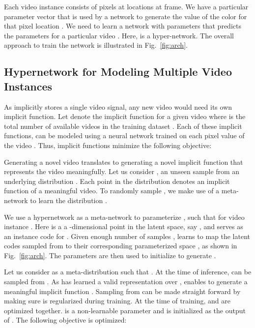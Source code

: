 \documentclass[10pt]{article} \usepackage[accepted]{tmlr}
\begin{document}
\label{method}
Each video instance  consists of pixels at locations  at  frame. We have a particular parameter vector  that is used by a network  to generate the value of the color  for that pixel location . We need to learn a network  with parameters  that predicts the parameters  for a particular video . Here,  is a hyper-network. The overall approach to train the network is illustrated in Fig.~\ref{fig:arch}.

\subsection{Hypernetwork for Modeling Multiple Video Instances}

As   implicitly stores a single video signal, any new video would need its own implicit function. 
Let  denote the implicit function for a given video  where  is the total number of available videos in the training dataset . Each of these implicit functions,  can be modeled using a neural network trained on each pixel value of the video . Thus, implicit functions minimize the following objective: 

Generating a novel video  translates to generating a novel implicit function  that represents the video meaningfully. Let us consider , an unseen sample from an underlying distribution . Each point in the distribution  denotes an implicit function of a meaningful video. To randomly sample , we make use of a meta-network to learn the distribution . 

We use a hypernetwork  as a meta-network to parameterize , such that  for video instance . Here  is a a -dimensional point in the latent space, say , and serves as an instance code for .
Given enough number of samples ,  learns to map the latent codes sampled from  to their corresponding parameterized space , as shown in Fig.~\ref{fig:arch}. 
The parameters  are then used to initialize  to generate .

Let us consider  as a meta-distribution such that . At the time of inference,  can be sampled from . As  has learned a valid representation over ,  enables  to generate a meaningful implicit function . Sampling from  can be made straight forward by making sure  is regularized during training. 
At the time of training,  and  are optimized together. 
 is a non-learnable parameter and  is initialized as the output of . 
The following objective is optimized:
\end{document}
